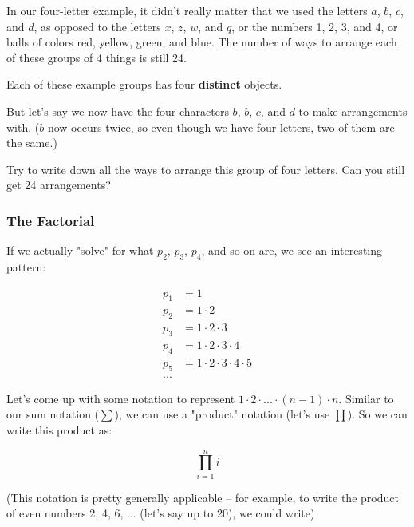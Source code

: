 \begin{exercise}
In our four-letter example, it didn't really matter that we used the letters $a$, $b$, $c$, and $d$, as opposed to the letters $x$, $z$, $w$, and $q$, or the numbers 1, 2, 3, and 4, or balls of colors red, yellow, green, and blue. The number of ways to arrange each of these groups of 4 things is still 24.

Each of these example groups has four \textbf{distinct} objects. 

But let's say we now have the four characters $b$, $b$, $c$, and $d$ to make arrangements with. ($b$ now occurs twice, so even though we have four letters, two of them are the same.)

Try to write down all the ways to arrange this group of four letters. Can you still get 24 arrangements?

\end{exercise}

\subsubsection{The Factorial}

If we actually "solve" for what $p_2$, $p_3$, $p_4$, and so on are, we see an interesting pattern:

\begin{align*}
p_1 &= 1 \\
p_2 &= 1 \cdot 2 \\
p_3 &= 1 \cdot 2 \cdot 3 \\
p_4 &= 1 \cdot 2 \cdot 3 \cdot 4 \\
p_5 &= 1 \cdot 2 \cdot 3 \cdot 4 \cdot 5 \\
...
\end{align*}

Let's come up with some notation to represent $1 \cdot 2 \cdot ... \cdot (n-1) \cdot n$. Similar to our sum notation ($\sum$), we can use a "product" notation (let's use $\prod$). So we can write this product as:

\begin{equation}
\label{prod-i}
\prod_{i=1}^n i
\end{equation}

(This notation is pretty generally applicable -- for example, to write the product of even numbers 2, 4, 6, ... (let's say up to 20), we could write)

